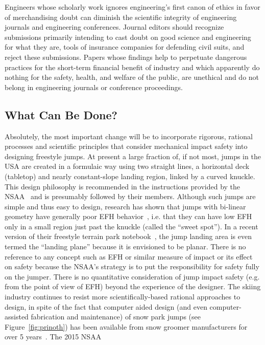 \documentclass{article}
\begin{document}
Engineers whose scholarly work ignores engineering's first canon of ethics in
favor of merchandising doubt can diminish the scientific integrity of
engineering journals and engineering conferences. Journal editors should
recognize submissions primarily intending to cast doubt on good science and
engineering for what they are, tools of insurance companies for defending civil
suits, and reject these submissions. Papers whose findings help to perpetuate
dangerous practices for the short-term financial benefit of industry and which
apparently do nothing for the safety, health, and welfare of the public, are
unethical and do not belong in engineering journals or conference proceedings.

\subsection{What Can Be Done?}
\label{sec:action}
%
Absolutely, the most important change will be to incorporate rigorous, rational
processes and scientific principles that consider mechanical impact safety into
designing freestyle jumps.  At present a large fraction of, if not most, jumps
in the USA are created in a formulaic way using two straight lines, a
horizontal deck (tabletop) and nearly constant-slope landing region, linked by
a curved knuckle. This design philosophy is recommended in the instructions
provided by the NSAA~\cite{NSAA2015} and is presumably followed by their
members. Although such jumps are simple and thus easy to design, research has
shown that jumps with bi-linear geometry have generally poor EFH
behavior~\cite{Swedberg2012}, i.e. that they can have low EFH only in a small
region just past the knuckle (called the ``sweet spot''). In a recent version
of their freestyle terrain park notebook~\cite{NSAA2015}, the jump landing area
is even termed the ``landing plane'' because it is envisioned to be planar.
There is no reference to any concept such as EFH or similar measure of impact
or its effect on safety because the NSAA's strategy is to put the
responsibility for safety fully on the jumper. There is no quantitative
consideration of jump impact safety (e.g. from the point of view of EFH) beyond
the experience of the designer. The skiing industry continues to resist more
scientifically-based rational approaches to design, in spite of the fact that
computer aided design (and even computer-assisted fabrication and maintenance)
of snow park jumps (see Figure~\ref{fig:prinoth}) has been available from snow
groomer manufacturers for over 5 years~\cite{Muigg2019}. The 2015 NSAA
\end{document}

